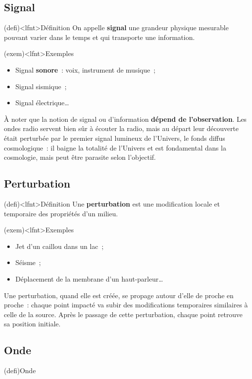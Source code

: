 \documentclass[../../main/main.tex]{subfiles}
\begin{document}
\subsection{Signal}
\begin{tcn}(defi)<lfnt>{\tiny Définition}
	On appelle \textbf{signal} une grandeur physique mesurable pouvant varier
	dans le temps et qui transporte une information.
\end{tcn}
\begin{tcn}(exem)<lfnt>{Exemples}
	\begin{itemize}
		\item Signal \textbf{sonore}~: voix, instrument de musique~;
		\item Signal sismique~;
		\item Signal électrique…
	\end{itemize}
\end{tcn}
À noter que la notion de signal ou d'information \textbf{dépend de
	l'observation}. Les ondes radio servent bien sûr à écouter la radio, mais au
départ leur découverte était perturbée par le premier signal lumineux de
l'Univers, le fonds diffus cosmologique~: il baigne la totalité de l'Univers et
est fondamental dans la cosmologie, mais peut être parasite selon l'objectif.

\subsection{Perturbation}

\begin{tcn}(defi)<lfnt>{\tiny Définition}
	Une \textbf{perturbation} est une modification locale et temporaire des
	propriétés d'un milieu.
\end{tcn}
\begin{tcn}(exem)<lfnt>{Exemples}
	\begin{itemize}
		\item Jet d'un caillou dans un lac~;
		\item Séisme~;
		\item Déplacement de la membrane d'un haut-parleur…
	\end{itemize}
\end{tcn}
Une perturbation, quand elle est créée, se propage autour d'elle de proche en
proche~: chaque point impacté va subir des modifications temporaires similaires
à celle de la source. Après le passage de cette perturbation, chaque point
retrouve sa position initiale.

\subsection{Onde}
\begin{tcb}(defi){Onde}
\end{tcb}
\end{document}
